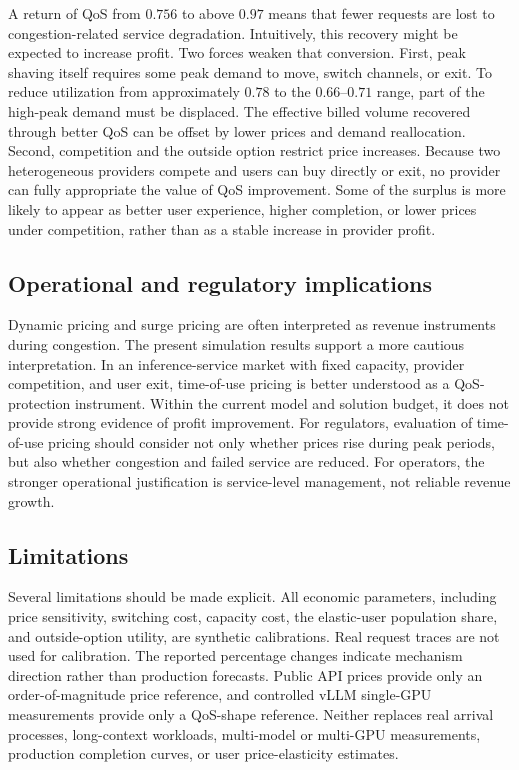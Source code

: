 \documentclass[11pt,a4paper]{article}
\begin{document}
A return of QoS from $0.756$ to above $0.97$ means that fewer requests are lost to congestion-related service degradation. Intuitively, this recovery might be expected to increase profit. Two forces weaken that conversion. First, peak shaving itself requires some peak demand to move, switch channels, or exit. To reduce utilization from approximately $0.78$ to the $0.66$--$0.71$ range, part of the high-peak demand must be displaced. The effective billed volume recovered through better QoS can be offset by lower prices and demand reallocation. Second, competition and the outside option restrict price increases. Because two heterogeneous providers compete and users can buy directly or exit, no provider can fully appropriate the value of QoS improvement. Some of the surplus is more likely to appear as better user experience, higher completion, or lower prices under competition, rather than as a stable increase in provider profit.

\subsection{Operational and regulatory implications}

Dynamic pricing and surge pricing are often interpreted as revenue instruments during congestion. The present simulation results support a more cautious interpretation. In an inference-service market with fixed capacity, provider competition, and user exit, time-of-use pricing is better understood as a QoS-protection instrument. Within the current model and solution budget, it does not provide strong evidence of profit improvement. For regulators, evaluation of time-of-use pricing should consider not only whether prices rise during peak periods, but also whether congestion and failed service are reduced. For operators, the stronger operational justification is service-level management, not reliable revenue growth.

\subsection{Limitations}
\label{sec:limitations}

Several limitations should be made explicit. All economic parameters, including price sensitivity, switching cost, capacity cost, the elastic-user population share, and outside-option utility, are synthetic calibrations. Real request traces are not used for calibration. The reported percentage changes indicate mechanism direction rather than production forecasts. Public API prices provide only an order-of-magnitude price reference, and controlled vLLM single-GPU measurements provide only a QoS-shape reference. Neither replaces real arrival processes, long-context workloads, multi-model or multi-GPU measurements, production completion curves, or user price-elasticity estimates.
\end{document}
